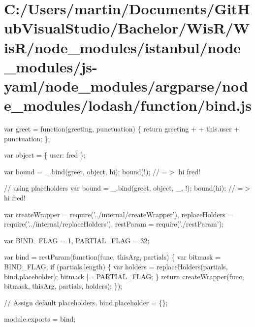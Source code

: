 \hypertarget{_c_1_2_users_2martin_2_documents_2_git_hub_visual_studio_2_bachelor_2_wis_r_2_wis_r_2node_modulecab4dd91fb657042147e5d27dfff3abf}{}\section{C\+:/\+Users/martin/\+Documents/\+Git\+Hub\+Visual\+Studio/\+Bachelor/\+Wis\+R/\+Wis\+R/node\+\_\+modules/istanbul/node\+\_\+modules/js-\/yaml/node\+\_\+modules/argparse/node\+\_\+modules/lodash/function/bind.\+js}
var greet = function(greeting, punctuation) \{ return greeting + \textquotesingle{} \textquotesingle{} + this.\+user + punctuation; \};

var object = \{ \textquotesingle{}user\textquotesingle{}\+: \textquotesingle{}fred\textquotesingle{} \};

var bound = \+\_\+.\+bind(greet, object, \textquotesingle{}hi\textquotesingle{}); bound(\textquotesingle{}!\textquotesingle{}); // =$>$ \textquotesingle{}hi fred!\textquotesingle{}

// using placeholders var bound = \+\_\+.\+bind(greet, object, \+\_\+, \textquotesingle{}!\textquotesingle{}); bound(\textquotesingle{}hi\textquotesingle{}); // =$>$ \textquotesingle{}hi fred!\textquotesingle{}


\begin{DoxyCodeInclude}
var createWrapper = require(\textcolor{stringliteral}{'../internal/createWrapper'}),
    replaceHolders = require(\textcolor{stringliteral}{'../internal/replaceHolders'}),
    restParam = require(\textcolor{stringliteral}{'./restParam'});

var BIND\_FLAG = 1,
    PARTIAL\_FLAG = 32;

var bind = restParam(\textcolor{keyword}{function}(func, thisArg, partials) \{
  var bitmask = BIND\_FLAG;
  \textcolor{keywordflow}{if} (partials.length) \{
    var holders = replaceHolders(partials, bind.placeholder);
    bitmask |= PARTIAL\_FLAG;
  \}
  \textcolor{keywordflow}{return} createWrapper(func, bitmask, thisArg, partials, holders);
\});

\textcolor{comment}{// Assign default placeholders.}
bind.placeholder = \{\};

module.exports = bind;
\end{DoxyCodeInclude}
 